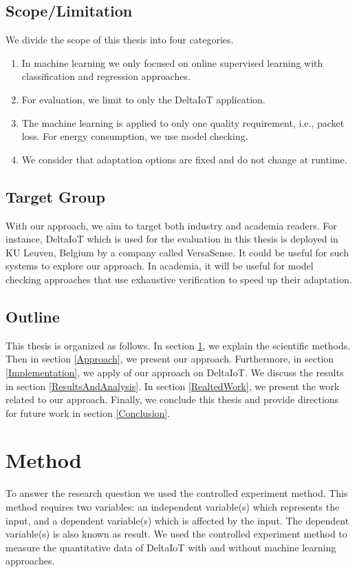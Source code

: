 \documentclass[a4paper,12pt]{article}
\begin{document}
\subsection{Scope/Limitation}
We divide the scope of this thesis into four categories.
\begin{enumerate}
	\item In machine learning we only focused on online supervised learning with classification and regression approaches.
	\item For evaluation, we limit to only the DeltaIoT application.
	\item The machine learning is applied to only one quality requirement, i.e., packet loss. For energy consumption, we use model checking.
	\item We consider that adaptation options are fixed and do not change at runtime.
\end{enumerate}
\subsection{Target Group}
With our approach, we aim to target both industry and academia readers. For instance, DeltaIoT which is used for the evaluation in this thesis is deployed in KU Leuven, Belgium by a company called VersaSense. It could be useful for such systems to explore our approach. In academia, it will be useful for model checking approaches that use exhaustive verification to speed up their adaptation.
\subsection{Outline}
This thesis is organized as follows. In section \ref{Method}, we explain the scientific methods. Then in section \ref{Approach}, we present our approach. Furthermore, in section \ref{Implementation}, we apply of our approach on DeltaIoT. We discuss the results in section \ref{ResultsAndAnalysis}. In section \ref{RealtedWork}, we present the work related to our approach. Finally, we conclude this thesis and provide directions for future work in section \ref{Conclusion}. 
\newpage
\section{Method} \label{Method}
To answer the research question we used the controlled experiment method. This method requires two variables: an independent variable(s) which represents the input, and a dependent variable(s) which is affected by the input. The dependent variable(s) is also known as result. We used the controlled experiment method to measure the quantitative data of DeltaIoT with and without machine learning approaches. 
\end{document}
